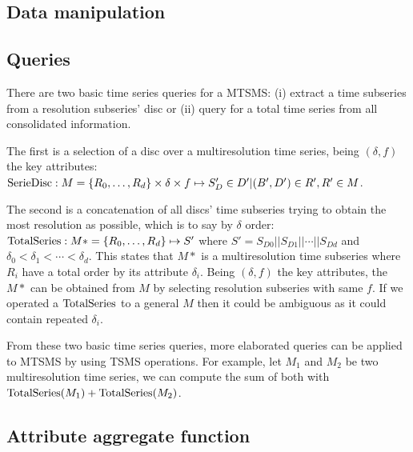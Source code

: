 

\subsection{Data manipulation}





\subsection{Queries}


There are two basic time series queries for a MTSMS: (i) extract a
time subseries from a resolution subseries' disc or (ii) query for a
total time series from all consolidated information.

The first is a selection of a disc over a multiresolution time series,
being $(\delta,f)$ the key attributes: $\operatorname{SerieDisc}: M=\{R_0, \dots,
R_d\} \times \delta \times f \mapsto S'_D \in D' | (B',D') \in R',R' \in
M$.

The second is a concatenation of all discs' time subseries trying to
obtain the most resolution as possible, which is to say by $\delta$
order: $\operatorname{TotalSeries}: M*=\{R_0, \dots, R_d\} \mapsto S'$ where $S' =
S_{D0} || S_{D1} || \cdots || S_{Dd}$ and $\delta_0 < \delta_1 <
\cdots < \delta_d$. This states that $M*$ is a multiresolution time
subseries where $R_i$ have a total order by its attribute
$\delta_i$. Being $(\delta,f)$ the key attributes, the $M*$ can
be obtained from $M$ by selecting resolution subseries with same $f$. If we
operated a $\operatorname{TotalSeries}$ to a general $M$ then it could be ambiguous
as it could contain repeated $\delta_i$.


From these two basic time series queries, more elaborated queries can
be applied to MTSMS by using TSMS operations. For example, let $M_1$
and $M_2$ be two multiresolution time series, we can compute the sum
of both with $\operatorname{TotalSeries}(M_1) + \operatorname{TotalSeries}(M_2)$. 





\subsection{Attribute aggregate function}
\label{sec:model:interpolador}

